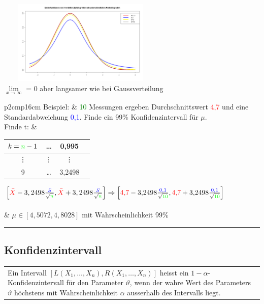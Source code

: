 	\begin{minipage}{10cm}
   		\includegraphics[width=8cm,height=4cm]{./bilder/T-Verteilung.png}\\
		$\lim \limits_{x\rightarrow \infty}$ = 0 aber langsamer wie bei
		Gaussverteilung 
    \end{minipage}

		\begin{tabular}{p{2cm}p{16cm}}
        Beispiel: & \textcolor{green}{10} Messungen ergeben Durchschnittswert
        \textcolor{red}{4{,}7} und eine Standardabweichung \textcolor{blue}{0{,}1}.
        Finde ein 99\%  Konfidenzintervall für $\mu$.\\
        
         Finde t: & \begin{tabular}{| c | c | c | c |}
                   \hline
                   $k=\textcolor{green}{n}-1$ & \ldots & 0{,}995\\
                   \hline
                   \vdots & \vdots & \vdots \\
                   \hline
                   9 & \ldots & 3{,}2498\\
                   \hline
                   \end{tabular}
        
       		 $\left[\textcolor{red}{\bar{X}}-3,2498\frac{\textcolor{blue}{S}}{\sqrt{\textcolor{green}{n}}},
		\textcolor{red}{\bar{X}}+3,2498\frac{\textcolor{blue}{S}}{\sqrt{\textcolor{green}{n}}}\right]
		\Rightarrow 
		\left[{\color{red}4{,}7}-3{,}2498\frac{\textcolor{blue}{0{,}1}}{\sqrt{\textcolor{green}{10}}},
		\textcolor{red}{4{,}7}+3{,}2498\frac{\textcolor{blue}{0{,}1}}{\sqrt{\textcolor{green}{10}}}\right]$\\ \\
		& $\mu\in \left[4{,}5072, 4{,}8028\right]$ mit Wahrscheinlichkeit 99\%
        \end{tabular}
\hrule

	\subsection{Konfidenzintervall  }
	\begin{tabular}{p{18cm}}
     Ein Intervall $[L(X_1,\ldots,X_n),R(X_1,\ldots,X_n)]$ heisst ein
     $1-\alpha$- Konfidenzintervall für den Parameter $\vartheta$, wenn der wahre
     Wert des Parameters $\vartheta$ höchstens mit Wahrscheinlichkeit $\alpha$
     ausserhalb des Intervalls liegt.
    \end{tabular}\\

